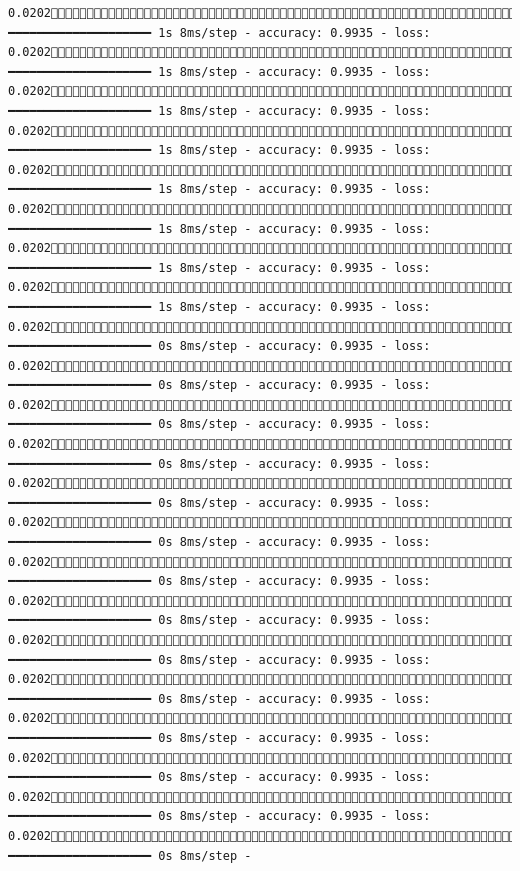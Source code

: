 \documentclass[
  letterpaper,
  DIV=11,
  numbers=noendperiod]{scrreprt}
\begin{document}
\begin{verbatim}
0.02021689/1875 ━━━━━━━━━━━━━━━━━━━━ 1s 8ms/step - accuracy: 0.9935 - loss: 0.02021696/1875 ━━━━━━━━━━━━━━━━━━━━ 1s 8ms/step - accuracy: 0.9935 - loss: 0.02021703/1875 ━━━━━━━━━━━━━━━━━━━━ 1s 8ms/step - accuracy: 0.9935 - loss: 0.02021710/1875 ━━━━━━━━━━━━━━━━━━━━ 1s 8ms/step - accuracy: 0.9935 - loss: 0.02021717/1875 ━━━━━━━━━━━━━━━━━━━━ 1s 8ms/step - accuracy: 0.9935 - loss: 0.02021725/1875 ━━━━━━━━━━━━━━━━━━━━ 1s 8ms/step - accuracy: 0.9935 - loss: 0.02021732/1875 ━━━━━━━━━━━━━━━━━━━━ 1s 8ms/step - accuracy: 0.9935 - loss: 0.02021739/1875 ━━━━━━━━━━━━━━━━━━━━ 1s 8ms/step - accuracy: 0.9935 - loss: 0.02021746/1875 ━━━━━━━━━━━━━━━━━━━━ 0s 8ms/step - accuracy: 0.9935 - loss: 0.02021753/1875 ━━━━━━━━━━━━━━━━━━━━ 0s 8ms/step - accuracy: 0.9935 - loss: 0.02021760/1875 ━━━━━━━━━━━━━━━━━━━━ 0s 8ms/step - accuracy: 0.9935 - loss: 0.02021767/1875 ━━━━━━━━━━━━━━━━━━━━ 0s 8ms/step - accuracy: 0.9935 - loss: 0.02021774/1875 ━━━━━━━━━━━━━━━━━━━━ 0s 8ms/step - accuracy: 0.9935 - loss: 0.02021781/1875 ━━━━━━━━━━━━━━━━━━━━ 0s 8ms/step - accuracy: 0.9935 - loss: 0.02021789/1875 ━━━━━━━━━━━━━━━━━━━━ 0s 8ms/step - accuracy: 0.9935 - loss: 0.02021795/1875 ━━━━━━━━━━━━━━━━━━━━ 0s 8ms/step - accuracy: 0.9935 - loss: 0.02021802/1875 ━━━━━━━━━━━━━━━━━━━━ 0s 8ms/step - accuracy: 0.9935 - loss: 0.02021810/1875 ━━━━━━━━━━━━━━━━━━━━ 0s 8ms/step - accuracy: 0.9935 - loss: 0.02021818/1875 ━━━━━━━━━━━━━━━━━━━━ 0s 8ms/step - accuracy: 0.9935 - loss: 0.02021826/1875 ━━━━━━━━━━━━━━━━━━━━ 0s 8ms/step - accuracy: 0.9935 - loss: 0.02021834/1875 ━━━━━━━━━━━━━━━━━━━━ 0s 8ms/step - accuracy: 0.9935 - loss: 0.02021841/1875 ━━━━━━━━━━━━━━━━━━━━ 0s 8ms/step - 
\end{verbatim}
\end{document}
